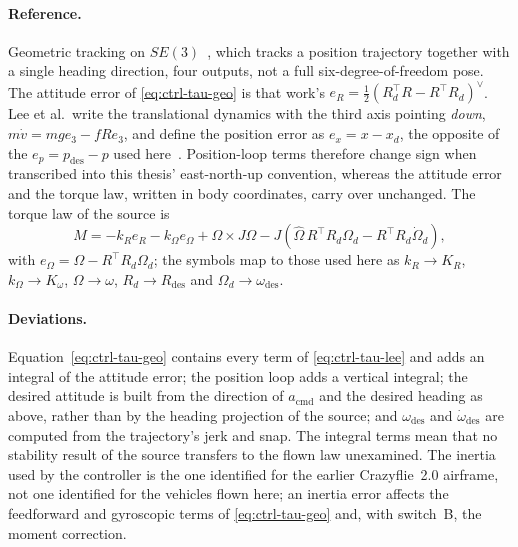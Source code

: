 \paragraph{Reference.} Geometric tracking on $SE(3)$~\cite{lee2010geometrictracking}, which tracks
a position trajectory together with a single heading direction, four outputs, not a full
six-degree-of-freedom pose. The attitude error of \eqref{eq:ctrl-tau-geo} is that work's
$e_R = \tfrac{1}{2}(R_d^\top R - R^\top R_d)^\vee$.
Lee et al.\ write the translational dynamics with the third axis pointing \emph{down},
$m\dot v = mge_3 - fRe_3$, and define the position error as $e_x = x - x_d$, the opposite of the
$e_p = p_{\mathrm{des}} - p$ used here~\cite{lee2010geometricse3}. Position-loop terms therefore change
sign when transcribed into this thesis' east-north-up convention, whereas the attitude error and
the torque law, written in body coordinates, carry over unchanged.
The torque law of the source is
%
\begin{equation}
  M = -k_R e_R - k_\Omega e_\Omega + \Omega \times J\Omega
      - J\!\left( \hat{\Omega}\, R^\top R_d \Omega_d - R^\top R_d \dot{\Omega}_d \right),
  \label{eq:ctrl-tau-lee}
\end{equation}
%
with $e_\Omega = \Omega - R^\top R_d \Omega_d$; the symbols map to those used here as $k_R \to K_R$,
$k_\Omega \to K_\omega$, $\Omega \to \omega$, $R_d \to R_{\mathrm{des}}$ and $\Omega_d \to \omega_{\mathrm{des}}$.

\paragraph{Deviations.} Equation~\eqref{eq:ctrl-tau-geo} contains every term of
\eqref{eq:ctrl-tau-lee} and adds an integral of the attitude error; the position loop adds a
vertical integral; the desired attitude is built from the direction of $a_{\mathrm{cmd}}$ and the
desired heading as above, rather than by the heading projection of the source; and $\omega_{\mathrm{des}}$
and $\dot\omega_{\mathrm{des}}$ are computed from the trajectory's jerk and snap. The integral terms
mean that no stability result of the source transfers to the flown law unexamined. The inertia
used by the controller is the one identified for the earlier Crazyflie~2.0 airframe, not one
identified for the vehicles flown here; an inertia error affects the feedforward and gyroscopic
terms of \eqref{eq:ctrl-tau-geo} and, with switch~B, the moment correction.

